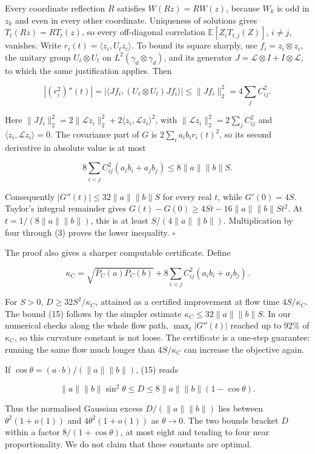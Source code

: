 \documentclass[
  british,
  11pt,
  a4paper,
]{article}
\begin{document}
Every coordinate reflection \(R\) satisfies \(W(Rz)=RW(z)\), because
\(W_k\) is odd in \(z_k\) and even in every other coordinate. Uniqueness
of solutions gives \(T_t(Rz)=RT_t(z)\), so every off-diagonal
correlation \(\mathbb E[Z_iT_{t,j}(Z)]\), \(i\ne j\), vanishes. Write
\(r_i(t)=\langle z_i,U_tz_i\rangle\). To bound its square sharply, use
\(f_i=z_i\otimes z_i\), the unitary group \(U_t\otimes U_t\) on
\(L^2(\gamma_d\otimes\gamma_d)\), and its generator
\(J=\mathcal L\otimes I+I\otimes\mathcal L\), to which the same
justification applies. Then

\[
|(r_i^2)''(t)|
=|\langle Jf_i,(U_t\otimes U_t)Jf_i\rangle|
\leq\|Jf_i\|_2^2=4\sum_j C_{ij}^2.                             \tag{17}
\]

Here
\(\|Jf_i\|_2^2=2\|\mathcal Lz_i\|_2^2+2\langle z_i,\mathcal Lz_i\rangle^2\),
with \(\|\mathcal Lz_i\|_2^2=2\sum_jC_{ij}^2\) and
\(\langle z_i,\mathcal Lz_i\rangle=0\). The covariance part of \(G\) is
\(2\sum_i a_ib_ir_i(t)^2\), so its second derivative in absolute value
is at most

\[
8\sum_{i<j}C_{ij}^2(a_ib_i+a_jb_j)\leq8\|a\|\|b\|S.
\]

Consequently \(|G''(t)|\leq32\|a\|\|b\|S\) for every real \(t\), while
\(G'(0)=4S\). Taylor's integral remainder gives
\(G(t)-G(0)\geq4St-16\|a\|\|b\|St^2\). At \(t=1/(8\|a\|\|b\|)\), this is
at least \(S/(4\|a\|\|b\|)\). Multiplication by four through (3) proves
the lower inequality. \(\square\)

The proof also gives a sharper computable certificate. Define

\[
\kappa_C=\sqrt{P_C(a)P_C(b)}
       +8\sum_{i<j}C_{ij}^2(a_ib_i+a_jb_j).
\]

For \(S>0\), \(D\geq32S^2/\kappa_C\), attained as a certified
improvement at flow time \(4S/\kappa_C\). The bound (15) follows by the
simpler estimate \(\kappa_C\leq32\|a\|\|b\|S\). In our numerical checks
along the whole flow path, \(\max_t|G''(t)|\) reached up to 92\% of
\(\kappa_C\), so this curvature constant is not loose. The certificate
is a one-step guarantee: running the same flow much longer than
\(4S/\kappa_C\) can increase the objective again.

If \(\cos\theta=(a\cdot b)/(\|a\|\|b\|)\), (15) reads

\[
\|a\|\|b\|\sin^2\theta\leq D\leq8\|a\|\|b\|(1-\cos\theta).              \tag{18}
\]

Thus the normalised Gaussian excess \(D/(\|a\|\|b\|)\) lies between
\(\theta^2(1+o(1))\) and \(4\theta^2(1+o(1))\) as \(\theta\to0\). The
two bounds bracket \(D\) within a factor \(8/(1+\cos\theta)\), at most
eight and tending to four near proportionality. We do not claim that
these constants are optimal.
\end{document}

